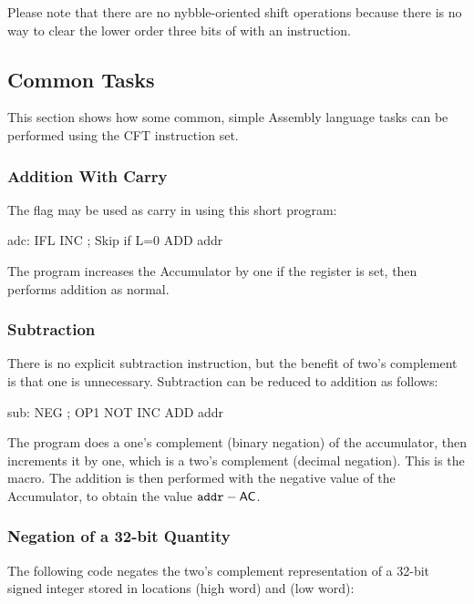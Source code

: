 Please note that there are no nybble-oriented shift operations because
there is no way to clear the lower order three bits of \A{} with an
 instruction.

\subsection{Common Tasks}

This section shows how some common, simple Assembly language tasks can
be performed using the CFT instruction set.

\subsubsection{Addition With Carry}

The \Lreg{} flag may be used as carry in using this short program:
\begin{cftasmcode}
adc:   IFL INC      ; Skip if L=0
       ADD addr
\end{cftasmcode}

The program increases the \gls{Accumulator} by one if the \Lreg{} register is set,
then performs addition as normal.

\subsubsection{Subtraction}

There is no explicit subtraction instruction, but the benefit of two's
complement is that one is unnecessary. Subtraction can be reduced to
addition as follows:

\begin{cftasmcode}
sub:    NEG         ; OP1 NOT INC
        ADD addr
\end{cftasmcode}

The program does a one's complement (binary negation) of the accumulator, then
increments it by one, which is a two's complement (decimal negation). This is
the  macro. The addition is then performed with the negative value of
the \gls{Accumulator}, to obtain the value $\mbox{\asm{addr}} - \mbox{\AC}$.

\subsubsection{Negation of a 32-bit Quantity}

The following code negates the two's complement representation of a
32-bit signed integer stored in locations  (high word) and
 (low word):

